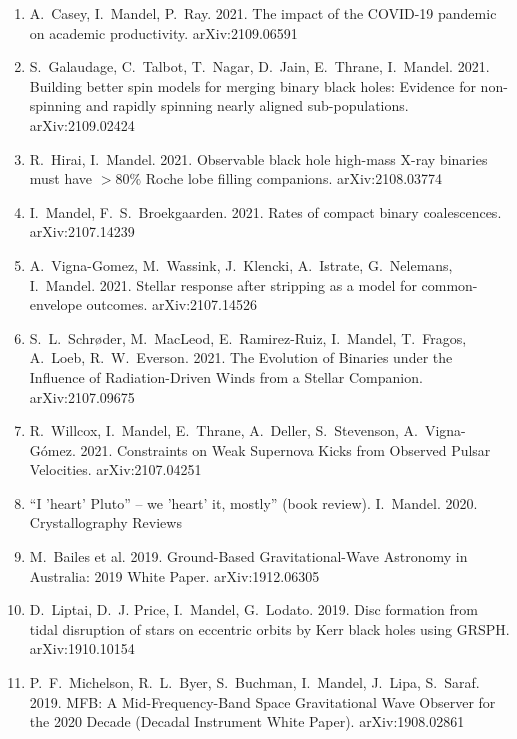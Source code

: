 \documentclass[margin,line]{res}
\begin{document}
\begin{resume}
\begin{enumerate}
\item A.~Casey, I.~Mandel, P.~Ray. 2021. The impact of the COVID-19 pandemic on academic productivity.  arXiv:2109.06591

\item S.~Galaudage, C.~Talbot, T.~Nagar, D.~Jain, E.~Thrane, I.~Mandel.  2021. Building better spin models for merging binary black holes: Evidence for non-spinning and rapidly spinning nearly aligned sub-populations. arXiv:2109.02424

\item R.~Hirai, I.~Mandel. 2021. Observable black hole high-mass X-ray binaries must have $>80\%$ Roche lobe filling companions. arXiv:2108.03774 

\item I.~Mandel, F.~S.~Broekgaarden. 2021. Rates of compact binary coalescences. arXiv:2107.14239

\item A.~Vigna-Gomez, M.~Wassink, J.~Klencki, A.~Istrate, G.~Nelemans, I.~Mandel.  2021. Stellar response after stripping as a model for common-envelope outcomes. arXiv:2107.14526

\item S.~L.~Schr{\o}der, M.~MacLeod, E.~Ramirez-Ruiz, I.~Mandel, T.~Fragos, A.~Loeb, R.~W.~Everson. 2021. The Evolution of Binaries under the Influence of Radiation-Driven Winds
  from a Stellar Companion.  arXiv:2107.09675

\item R.~Willcox, I.~Mandel, E.~Thrane, A.~Deller, S.~Stevenson, A.~Vigna-G{\'o}mez.  2021. Constraints on Weak Supernova Kicks from Observed Pulsar Velocities.  arXiv:2107.04251 

\item ``I 'heart' Pluto'' -- we 'heart' it, mostly'' (book review).  I.~Mandel.  2020.  Crystallography Reviews

\item M.~Bailes et al. 2019. Ground-Based Gravitational-Wave Astronomy in Australia: 2019 White Paper. arXiv:1912.06305

\item D.~Liptai, D.~J. Price, I.~Mandel, G.~Lodato.  2019.  Disc formation from tidal disruption of stars on eccentric orbits by Kerr black holes using GRSPH.  arXiv:1910.10154

\item P.~F.~Michelson, R.~L.~Byer, S.~Buchman, I.~Mandel, J.~Lipa, S.~Saraf.  2019. MFB: A Mid-Frequency-Band Space Gravitational Wave Observer for the 2020 Decade (Decadal Instrument White Paper). arXiv:1908.02861 


\end{enumerate}
\end{resume}
\end{document}

